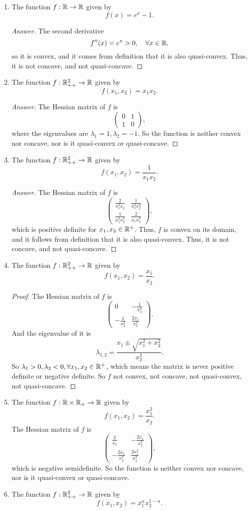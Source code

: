 \begin{enumerate}
	\item The function \(f: \mathbb{R} \to \mathbb{R}\) given by
	\[ f(x)=e^x-1. \]
	\begin{proof}[Answer]
	The second derivative
	\[ f''(x)=e^x>0,\quad \forall x\in\mathbb{R}, \]
	so it is convex, and it comes from definition that it is also quasi-convex.
	Thus, it is not concave, and not quasi-concave.
	\end{proof}
	\item The function \(f: \mathbb{R}_{++}^2 \to \mathbb{R}\) given by
	\[ f(x_1,x_2)=x_1 x_2. \]
	\begin{proof}[Answer]
	The Hessian matrix of \(f\) is
	\[ \begin{pmatrix} 0 & 1 \\ 1 & 0 \end{pmatrix}, \]
	where the eigenvalues are \(\lambda_1=1,\lambda_2=-1\).
	So the function is neither convex nor concave, nor is it quasi-convex or quasi-concave.
	\end{proof}
	\item The function \(f: \mathbb{R}_{++}^2 \to \mathbb{R}\) given by
	\[ f(x_1,x_2)=\frac{1}{x_1 x_2}. \]
	\begin{proof}[Answer]
	The Hessian matrix of \(f\) is
	\[ \begin{pmatrix} \frac{2}{x_1^3 x_2} & \frac{1}{x_1^2 x_2^2} \\ \frac{1}{x_1^2 x_2^2} & \frac{2}{x_1 x_2^3} \end{pmatrix}, \]
	which is positive definite for \(x_1,x_2\in\mathbb{R}^{+}\).
	Thus, \(f\) is convex on its domain, and it follows from definition that it is also quasi-convex.
	Thus, it is not concave, and not quasi-concave.
	\end{proof}
	\item The function \(f: \mathbb{R}_{++}^2 \to \mathbb{R}\) given by
	\[ f(x_1,x_2)=\frac{x_1}{x_2}. \]
	\begin{proof}
	The Hessian matrix of \(f\) is
	\[ \begin{pmatrix} 0 & -\frac{1}{x_2^2} \\ -\frac{1}{x_2^2} & \frac{2x_1}{x_2^3} \end{pmatrix}. \]
	And the eigenvalue of it is
	\[ \lambda_{1,2}=\frac{x_1\pm\sqrt{x_1^2+x_2^2}}{x_2^3}. \]
	So \(\lambda_1>0,\lambda_2<0,\forall x_1,x_2\in\mathbb{R}^+\), which means the matrix is never positive definite or negative definite.
	So \(f\) not convex, not concave, not quasi-convex, not quasi-concave.
	\end{proof}
	\item The function \(f: \mathbb{R}\times\mathbb{R}_+ \to \mathbb{R}\) given by
	\[ f(x_1,x_2)=\frac{x_1^2}{x_2}. \]
	The Hessian matrix of \(f\) is
	\[ \begin{pmatrix} \frac{2}{x_2} & -\frac{2x_1}{x_2^2} \\ -\frac{2x_1}{x_2^2} & \frac{2x_1^2}{x_2^3} \end{pmatrix}, \]
	which is negative semidefinite.
	So the function is neither convex nor concave, nor is it quasi-convex or quasi-concave.
	\item The function \(f: \mathbb{R}_{++}^2 \to \mathbb{R}\) given by
	\[ f(x_1,x_2)=x_1^\alpha x_2^{1-\alpha}. \]
\end{enumerate}


